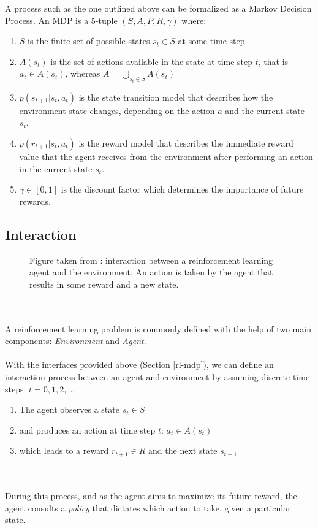 A process such as the one outlined above can be formalized as a Markov Decision Process.
An MDP is a 5-tuple $(S, A, P, R, \gamma)$ where:
\begin{enumerate}
    \item $S$ is the finite set of possible states $s_t \in S$ at some time step.
    \item $A(s_t)$ is the set of actions available in the state at time step $t$, that is $a_t \in A(s_t)$, whereas $A=\bigcup_{s_t \in S} A(s_t)$
    \item $p(s_{t+1} | s_t, a_t)$ is the state transition model that describes how the environment state changes, depending on the action $a$ and the current state $s_t$.
    \item $p(r_{t+1} | s_t, a_t)$ is the reward model that describes the immediate reward value that the agent receives from the environment after performing an action in the current state $s_t$.
    \item $\gamma \in [0,1]$ is the discount factor which determines the importance of future rewards.
\end{enumerate}

\subsection{Interaction}

\begin{figure}[H]
    \centering
    \caption{Figure taken from \cite{rl-demystified}: interaction between a reinforcement learning agent and the environment. An action is taken by the agent that results in some reward and a new state.}
    \label{fit:rl-overview}
\end{figure}
\\
\\
A reinforcement learning problem is commonly defined with the help of two main components: \textit{Environment} and \textit{Agent}.
\\
\\
With the interfaces provided above (Section \ref{rl-mdp}), we can define an interaction process between an agent and environment by assuming discrete time steps: $t=0, 1, 2, ...$

\begin{enumerate}
    \item The agent observes a state $s_t \in S$
    \item and produces an action at time step $t$: $a_t \in A(s_t)$
    \item which leads to a reward $r_{t+1} \in R$ and the next state $s_{t+1}$
\end{enumerate}
\\
\\
During this process, and as the agent aims to maximize its future reward, the agent consults a \textit{policy} that dictates which action to take, given a particular state.

